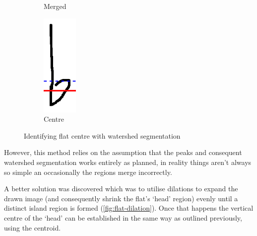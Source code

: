 \begin{figure}[H]
\begin{subfigure}[b]{.19\linewidth}
        \caption{Merged}
        \label{fig:flat-broken-merged}
    \end{subfigure}
    \begin{subfigure}[b]{.19\linewidth}
        \centering
        \includegraphics[height=5cm]{gfx/techniques/scoring/flats/6193-center.png}
        \caption{Centre}
    \end{subfigure}

  \caption{Identifying flat centre with watershed segmentation}
  \label{fig:flats-centre-watershed}
\end{figure}

However, this method relies on the assumption that the peaks and consequent watershed segmentation works entirely as planned, in reality things aren't always so simple an occasionally the regions merge incorrectly.

A better solution was discovered which was to utilise dilations to expand the drawn image (and consequently shrink the flat's `head' region) evenly until a distinct island region is formed (\cref{fig:flat-dilation}). Once that happens the vertical centre of the `head' can be established in the same way as outlined previously, using the centroid.

